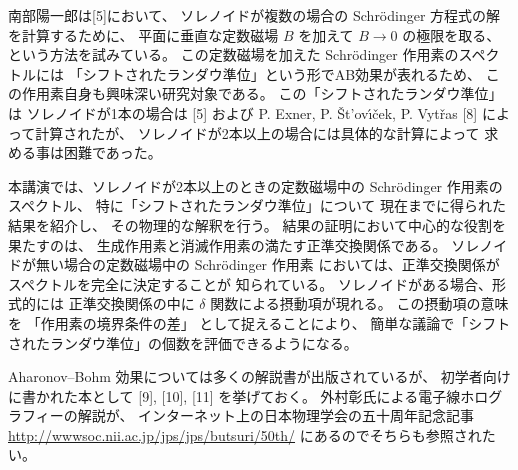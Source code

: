 \documentclass[uplatex,dvipdfmx]{jlreq}
\begin{document}
南部陽一郎は[5]において、
ソレノイドが複数の場合の Schr\"odinger 方程式の解を計算するために、
平面に垂直な定数磁場 $B$ を加えて
$B\rightarrow 0$ の極限を取る、という方法を試みている。
この定数磁場を加えた Schr\"odinger 作用素のスペクトルには
「シフトされたランダウ準位」という形でAB効果が表れるため、
この作用素自身も興味深い研究対象である。
この「シフトされたランダウ準位」は
ソレノイドが1本の場合は [5] および
P. Exner, P. {\v S}t'ov\'{\i}{\v c}ek, P. Vyt{\v r}as [8]
によって計算されたが、
ソレノイドが2本以上の場合には具体的な計算によって
求める事は困難であった。

本講演では、ソレノイドが2本以上のときの定数磁場中の
Schr\"odinger 作用素のスペクトル、
特に「シフトされたランダウ準位」について
現在までに得られた結果を紹介し、
その物理的な解釈を行う。
結果の証明において中心的な役割を果たすのは、
生成作用素と消滅作用素の満たす正準交換関係である。
ソレノイドが無い場合の定数磁場中の Schr\"odinger 作用素
においては、正準交換関係がスペクトルを完全に決定することが
知られている。
ソレノイドがある場合、形式的には
正準交換関係の中に $\delta$ 関数による摂動項が現れる。
この摂動項の意味を
「作用素の境界条件の差」
として捉えることにより、
簡単な議論で「シフトされたランダウ準位」の個数を評価できるようになる。

Aharonov--Bohm 効果については多くの解説書が出版されているが、
初学者向けに書かれた本として [9], [10], [11] を挙げておく。
外村彰氏による電子線ホログラフィーの解説が、
インターネット上の日本物理学会の五十周年記念記事
\url{http://wwwsoc.nii.ac.jp/jps/jps/butsuri/50th/}
にあるのでそちらも参照されたい。
\end{document}
